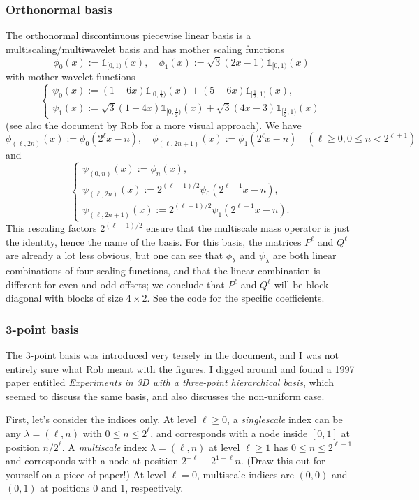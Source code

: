 \documentclass[11pt,a4paper]{amsart}
\theoremstyle{definition}
\newcommand{\bbone}{\mathds{1}}
\begin{document}
\subsubsection*{Orthonormal basis}
The orthonormal discontinuous piecewise linear basis is a multiscaling/multiwavelet basis and has mother scaling functions
\[
  \phi_0(x) := \bbone_{[0,1)}(x), \quad \phi_1(x) := \sqrt{3} (2x-1) \bbone_{[0,1)}(x)
\]
with mother wavelet functions
\[
  \begin{cases}
    \psi_0(x) := (1-6x) \bbone_{[0,\frac{1}{2})}(x) + (5-6x)\bbone_{[\frac{1}{2},1)}(x), \\
    \psi_1(x) := \sqrt{3} (1-4x) \bbone_{[0,\frac{1}{2})}(x) + \sqrt{3}(4x-3)\bbone_{[\frac{1}{2},1)}(x)
  \end{cases}
\]
(see also the document by Rob for a more visual approach). We have
\[
  \phi_{(\ell, 2n)}(x) := \phi_0(2^\ell x - n), \quad \phi_{(\ell, 2n+1)}(x) := \phi_1(2^\ell x - n) \quad (\ell \geq 0, 0 \leq n < 2^{\ell+1})
\]
and
\[
  \begin{cases}
  \psi_{(0, n)}(x) := \phi_n(x), \\
  \psi_{(\ell, 2n)}(x) := 2^{(\ell-1)/2} \psi_0(2^{\ell-1} x - n), \\
  \psi_{(\ell, 2n+1)}(x) := 2^{(\ell-1)/2} \psi_1(2^{\ell-1} x - n).
  \end{cases}
\]
This rescaling factors $2^{(\ell-1)/2}$ ensure that the multiscale mass operator
is just the identity, hence the name of the basis. For this basis, the matrices
$P^\ell$ and $Q^\ell$ are already a lot less obvious, but one can see that 
$\phi_\lambda$ and $\psi_\lambda$ are both linear combinations of four scaling
functions, and that the linear combination is different for even and odd offsets;
we conclude that $P^\ell$ and $Q^\ell$ will be block-diagonal with blocks of size
$4 \times 2$. See the code for the specific coefficients.

\subsubsection*{3-point basis}
The 3-point basis was introduced very tersely in the document, and I was not entirely
sure what Rob meant with the figures. I digged around and found a 1997 paper entitled
\emph{Experiments in 3D with a three-point hierarchical basis}, which seemed to
discuss the same basis, and also discusses the non-uniform case.

First, let's consider the indices only. At level $\ell \geq 0$, a \emph{singlescale}
index can be any $\lambda = (\ell, n)$ with $0 \leq n \leq 2^\ell$, and
corresponds with a node inside $[0,1]$ at position $n/2^\ell$. A \emph{multiscale} index
$\lambda = (\ell, n)$ at level $\ell \geq 1$ has $0 \leq n \leq 2^{\ell-1}$ and
corresponds with a node at position $2^{-\ell} + 2^{1-\ell} n$. (Draw this out
for yourself on a piece of paper!) At level $\ell=0$, multiscale indices are
$(0,0)$ and $(0,1)$ at positions $0$ and $1$, respectively.
\end{document}
